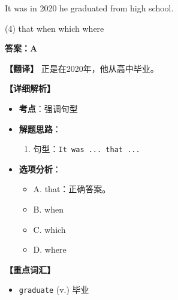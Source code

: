 \documentclass[11pt, a4paper]{article}
\newcommand{\analysis}[4]{
    \begin{solutionbox}
        \textbf{答案：#1}
        
        \textbf{【翻译】} #2
        
        \textbf{【详细解析】}
        #3
        
        \textbf{【重点词汇】}
        #4
    \end{solutionbox}
}
\newcommand{\blank}{\underline{\hspace{1.5cm}}}
\begin{document}
\begin{questions}
    \item It was in 2020 \blank he graduated from high school.
    \begin{tasks}(4)
        \task that \task when \task which \task where
    \end{tasks}
    \analysis{A}{正是在2020年，他从高中毕业。}{
        \begin{itemize}
            \item \textbf{考点}：强调句型
            \item \textbf{解题思路}：
                \begin{enumerate}
                    \item 句型：\texttt{It was ... that ...}
                \end{enumerate}
            \item \textbf{选项分析}：
                \begin{itemize}
                    \item A. that：正确答案。
                    \item B. when
                    \item C. which
                    \item D. where
                \end{itemize}
        \end{itemize}
    }{
        \begin{itemize}
            \item \texttt{graduate} (v.) 毕业
        \end{itemize}
    }


\end{questions}
\end{document}

